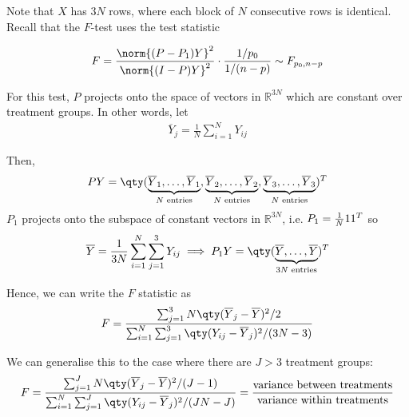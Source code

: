 Note that $X$ has $3N$ rows, where each block of $N$ consecutive rows is identical.
Recall that the $F$-test uses the test statistic

\begin{align*}
	F = \frac{\norm{(P-P_1)Y}^2}{\norm{(I-P)Y}^2} \cdot \frac{1/p_0}{1/(n-p)} \sim F_{p_0,n-p}
\end{align*}

For this test, $P$ projects onto the space of vectors in $\mathbb R^{3N}$ which are constant over treatment groups.
In other words, let
\begin{align*}
	\overline Y_j = \frac{1}{N} \sum_{i=1}^N Y_{ij}
\end{align*}

Then,
\begin{align*}
	P Y = \qty( \underbrace{\overline Y_1, \dots, \overline Y_1}_{N \text{ entries}}, \underbrace{\overline Y_2, \dots, \overline Y_2}_{N \text{ entries}}, \underbrace{\overline Y_3, \dots, \overline Y_3}_{N \text{ entries}} )^\tran
\end{align*}
$P_1$ projects onto the subspace of constant vectors in $\mathbb R^{3N}$, i.e. $P_1 = \frac{1}{N} 1 1^T$ so
\begin{align*}
	\overline Y = \frac{1}{3N} \sum_{i=1}^N \sum_{j=1}^3 Y_{ij} \implies P_1 Y = \qty( \underbrace{\overline Y, \dots, \overline Y}_{3N \text{ entries}} )^\tran
\end{align*}

Hence, we can write the $F$ statistic as
\begin{align*}
	F = \frac{\sum_{j=1}^3 N \qty(\overline Y_j - \overline Y)^2 / 2}{\sum_{i=1}^N \sum_{j=1}^3 \qty(Y_{ij} - \overline Y_j)^2 / (3N-3)}
\end{align*}

We can generalise this to the case where there are $J > 3$ treatment groups:
\begin{align*}
	F = \frac{\sum_{j=1}^J N \qty(\overline Y_j - \overline Y)^2 / (J-1)}{\sum_{i=1}^N \sum_{j=1}^J \qty(Y_{ij} - \overline Y_j)^2 / (JN-J)} = \frac{\text{variance between treatments}}{\text{variance within treatments}}
\end{align*}

